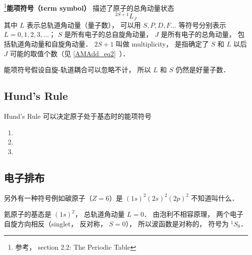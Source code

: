 

\footnote{参考\cite{GriffQ}， section 2.2: The Periodic Table}\textbf{能项符号（term symbol）} 描述了原子的总角动量状态
\begin{equation}
^{2S + 1} L_J
\end{equation}
其中 $L$ 表示总轨道角动量（量子数）， 可以用 $S, P, D, F \dots$ 等符号分别表示 $L = 0, 1, 2, 3, \dots$； $S$ 是所有电子的总自旋角动量， $J$ 是所有电子的总角动量， 包括轨道角动量和自旋角动量． $2S + 1$ 叫做 multiplicity， 是指确定了 $S$ 和 $L$ 以后 $J$ 可能的取值个数（见 \autoref{AMAdd_eq2}~）．

能项符号假设自旋-轨道耦合可以忽略不计， 所以 $L$ 和 $S$ 仍然是好量子数．

\subsection{Hund's Rule}
Hund's Rule 可以决定原子处于基态时的能项符号
\begin{enumerate}
\item 
\item 
\item 
\end{enumerate}

\subsection{电子排布}
另外有一种符号例如碳原子（$Z = 6$）是 $(1s)^2 (2s)^2 (2p)^2$ 不知道叫什么．

氦原子的基态是 $(1s)^2$， 总轨道角动量 $L = 0$． 由泡利不相容原理， 两个电子自旋方向相反（singlet， 反对称， $S = 0$）， 所以波函数是对称的， 符号为 $^1 S_0$．
